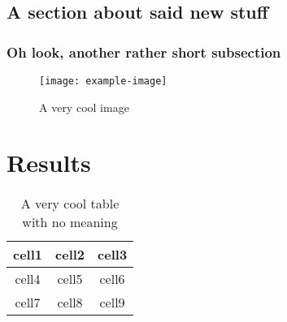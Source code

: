 \documentclass[letterpaper, openany, 12pt, oneside]{uithesis}
\begin{document}
\section{A section about said new stuff}
\lipsum[41-45]

\subsection{Oh look, another rather short subsection}
\begin{figure}[!htb]
	\centering
	\texttt{[image: example-image]}
	\caption{A very cool image}%
	\label{fig:four}
\end{figure}
\lipsum[46-47]

\chapter{Results}
\begin{table}
	\centering
	\label{table:one}
	\begin{tabular}{ c c c }
		cell1 & cell2 & cell3 \\ \hline
		cell4 & cell5 & cell6 \\ \hline
		cell7 & cell8 & cell9
	\end{tabular}
	\caption{A very cool table with no meaning}
\end{table}
\lipsum[48-61]

\backmatter

\printbibliography
\end{document}
